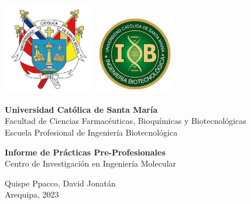 \documentclass[a4paper, 12pt]{article}
\begin{document}

\begin{titlepage}
    \begin{center}
      \includegraphics[width=4cm]{img/Sin título.png}\hfill
      \includegraphics[width=3.5cm]{img/images.jpeg}\par
      \vspace{3cm}
      \textbf{Universidad Católica de Santa María}\\
      Facultad de Ciencias Farmacéuticas, Bioquímicas y Biotecnológicas\\
      Escuela Profesional de Ingeniería Biotecnológica\par
      \vfill
      \textbf{Informe de Prácticas Pre-Profesionales}\\
      Centro de Investigación en Ingeniería Molecular\par
      \vfill
      Quispe Ppacco, David Jonatán\\
      Arequipa, 2023
    \end{center}

\end{titlepage}



\tableofcontents


\newpage
\end{document}
